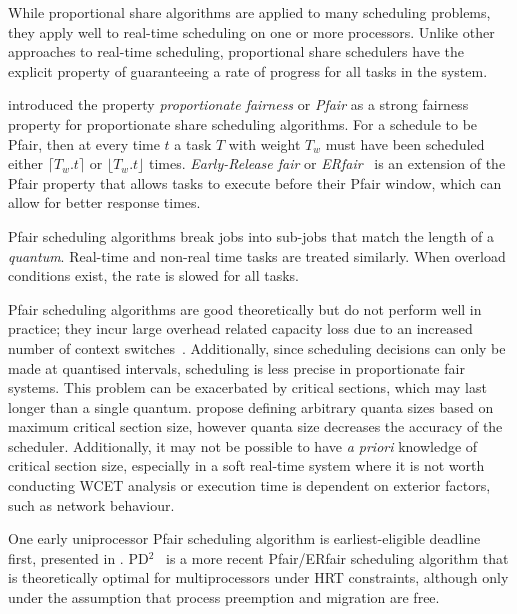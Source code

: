 While proportional share algorithms are applied to many scheduling problems, they apply
well to real-time scheduling on one or more processors.
Unlike other approaches to real-time scheduling, proportional share schedulers have the explicit property of guaranteeing a rate of progress for all tasks in the system.

\citet{Baruah_CPV_96} introduced the property \emph{proportionate fairness} or \emph{Pfair} as a
strong fairness property for proportionate share scheduling algorithms.  For a schedule to be Pfair,
then at every time $t$ a task $T$ with weight $T_{w}$ must have been scheduled either $\lceil T_{w}
. t \rceil$ or $\lfloor T_{w}.t \rfloor $ times.  \emph{Early-Release fair} or
\emph{ERfair}~\citep{Anderson_Srinivasan_04} is an extension of the Pfair property that allows tasks to
execute before their Pfair window, which can allow for better response times.

Pfair scheduling algorithms break jobs into sub-jobs that match the length of a \emph{quantum}.
Real-time and non-real time tasks are treated similarly.
When overload conditions exist, the rate is slowed for all tasks.

Pfair scheduling algorithms are good theoretically but do not perform well in practice; they incur
large overhead related capacity loss due to an increased number of context
switches~\citep{Abeni_Buttazzo_04}. Additionally, since
scheduling decisions can only be made at quantised intervals, scheduling is less precise in
proportionate fair systems.  This problem can be exacerbated by critical sections, which may last
longer than a single quantum.  \citet{Stoica_AKBGP_96} propose defining arbitrary quanta sizes based
on maximum critical section size, however quanta size decreases the accuracy of the scheduler.
Additionally, it may not be possible to have \emph{a priori} knowledge of critical section size, especially
in a soft real-time system where it is not worth conducting \gls{WCET} analysis or execution time
is dependent on exterior factors, such as network behaviour.

One early uniprocessor Pfair scheduling algorithm is earliest-eligible deadline first, presented in
\citet{Stoica_AKBGP_96}.  PD$^{2}$~\citep{Srinivasan_Anderson_06} is a more recent Pfair/ERfair
scheduling algorithm that is theoretically optimal for multiprocessors under \gls{HRT} constraints,
although only under the assumption that process preemption and migration are free.

